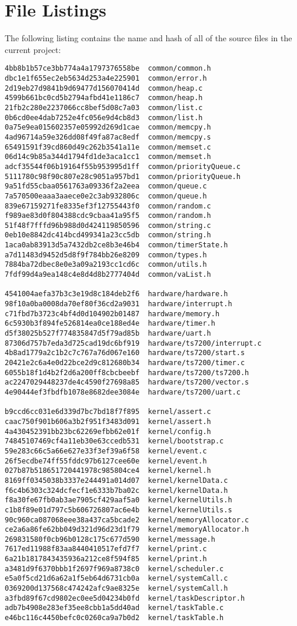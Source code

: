 \documentclass[twoside,a4paper]{refart}
\begin{document}
\section{File Listings}
The following listing contains the name and hash of all of the source files in the current project:
\begin{verbatim}
4bb8b1b57ce3bb774a4a1797376558be  common/common.h
dbc1e1f655ec2eb5634d253a4e225901  common/error.h
2d19eb27d9841b9d69477d156070414d  common/heap.c
4599b661bc0cd5b2794afbd41e1186c7  common/heap.h
21fb2c280e2237066cc8bef5d08c7a03  common/list.c
0b6cd0ee4dab7252e4fc056e9d4cb8d3  common/list.h
0a75e9ea015602357e05992d269d1cae  common/memcpy.h
4ad96714a59e326dd08f49fa87ac8edf  common/memcpy.s
65491591f39cd860d49c262b3541a11e  common/memset.c
06d14c9b85a344d1794fd1de3aca1cc1  common/memset.h
adcf35544f06b19164f55b953995d1ff  common/priorityQueue.c
5111780c98f90c807e28c9051a957bd1  common/priorityQueue.h
9a51fd55cbaa0561763a09336f2a2eea  common/queue.c
7a570500eaaa3aaece0e2c3ab932806c  common/queue.h
839e67159271fe8335ef3f12755443f0  common/random.c
f989ae83d0f804388cdc9cbaa41a95f5  common/random.h
51f48f7fffd96b988d0d424119850596  common/string.c
0eb10e8842dc414bcd499341a23cc5db  common/string.h
1aca0ab83913d5a7432db2ce8b3e46b4  common/timerState.h
a7d11483d9452d5d8f9f784bb26e8209  common/types.h
7884ba72dbec8e0e3a09a2193cc1cd6c  common/utils.h
7fdf99d4a9ea148c4e8d4d8b2777404d  common/vaList.h

4541004aefa37b3c3e19d8c184deb2f6  hardware/hardware.h
98f10a0ba0008da70ef80f36cd2a9031  hardware/interrupt.h
c71fbd7b3723c4bf4d0d104902b01487  hardware/memory.h
6c5930b3f894fe526814ea0ce188ed4e  hardware/timer.h
d5f38025b527f774835847d5f79ad85b  hardware/uart.h
87306d757b7eda3d725cad19dc6bf919  hardware/ts7200/interrupt.c
4b8ad1779a2c1b2c7c767a76d067e160  hardware/ts7200/start.s
20421e2c6a4e0d22bce2d9c812680b34  hardware/ts7200/timer.c
6055b18f1d4b2f2d6a200ff8cbcbeebf  hardware/ts7200/ts7200.h
ac2247029448237de4c4590f27698a85  hardware/ts7200/vector.s
4e90444ef3fbdfb1078e8682dee3084e  hardware/ts7200/uart.c

b9ccd6cc031e6d339d7bc7bd18f7f895  kernel/assert.c
caac750f901b606a3b2f951f3483d091  kernel/assert.h
4a430452391bb23bc62269efbb62e01f  kernel/config.h
74845107469cf4a11eb30e63ccedb531  kernel/bootstrap.c
59e283c66c5a66e627e33f3ef39a6f58  kernel/event.c
26f5ecdbe74ff55fddc97b6127cee60e  kernel/event.h
027b87b518651720441978c985804ce4  kernel/kernel.h
8169ff0345038b3337e244491a014d07  kernel/kernelData.c
f6c4b6303c324dcfecf1e6333b7ba02c  kernel/kernelData.h
f8a30fe67fb0ab3ae7905cf429aaf5a0  kernel/kernelUtils.h
c1b8f89e01d797c5b606726807ac6e4b  kernel/kernelUtils.s
90c960ca087068eee38a437ca5bcade2  kernel/memoryAllocator.c
ce2a6a86fe62bb049d321d96d23d1f79  kernel/memoryAllocator.h
269831580f0cb96b0128c175c677d590  kernel/message.h
7617ed11988f83aa8440410517efd7f7  kernel/print.c
6a21b1817843435936a212ce8f594f85  kernel/print.h
a3481d9f6370bbb1f2697f969a8738c0  kernel/scheduler.c
e5a0f5cd21d6a62a1f5eb64d6731cb0a  kernel/systemCall.c
0369200d137568c474242afc9ae8325e  kernel/systemCall.h
a3fbd89f67cd9802ec0ee5d04234b0fd  kernel/taskDescriptor.h
adb7b4908e283ef35ee8cbb1a5dd40ad  kernel/taskTable.c
e46bc116c4450befc0c0260ca9a7b0d2  kernel/taskTable.h


\end{verbatim}
\end{document}
